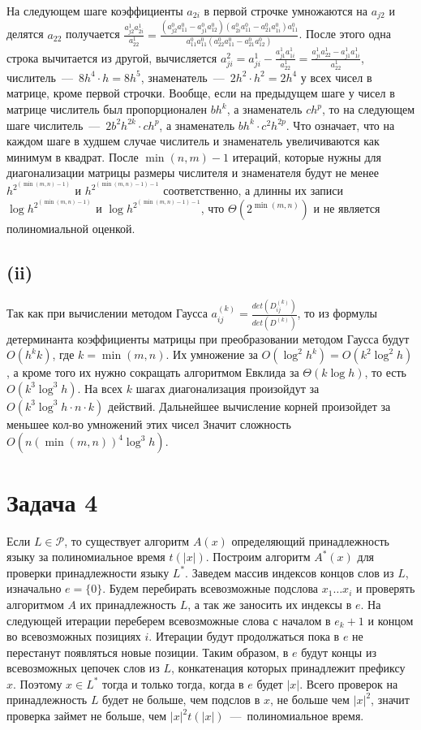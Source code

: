 \documentclass[a4paper,12pt]{article} %
\begin{document}
На следующем шаге коэффициенты $a_{2i}$ в первой строчке умножаются на $a_{j2}$ и делятся $a_{22}$ получается $\frac{a_{j2}^1a_{2i}^1}{a_{22}^1}=\frac{(a_{j2}^0a_{11}^0-a_{j1}^0a_{12}^0)(a_{2i}^0a_{11}^0-a_{21}^0a_{1i}^0)a_{11}^0}{a_{11}^0a_{11}^0(a_{22}^0a_{11}^0-a_{21}^0a_{12}^0)}$. После этого одна строка вычитается из другой, вычисляется $a_{ji}^2=a_{ji}^1-\frac{a_{j1}^1a_{1i}^1}{a_{22}^1}=\frac{a_{ji}^1a_{22}^1-a_{j1}^1a_{1i}^1}{a_{22}^1}$, числитель~---~$8h^4\cdot h=8h^5$, знаменатель~---~$2h^2\cdot h^2=2h^4$ у всех чисел в матрице, кроме первой строчки. Вообще, если на предыдущем шаге у чисел в матрице числитель был пропорционален $bh^k$, а знаменатель $ch^p$, то на следующем шаге числитель~---~$2b^2h^{2k}\cdot ch^p$, а знаменатель $bh^k\cdot c^2h^{2p}$. Что означает, что на каждом шаге в худшем случае числитель и знаменатель увеличиваются как минимум в квадрат. После $\min(n,m)-1$ итераций, которые нужны для диагонализации матрицы размеры числителя и знаменателя будут не менее $h^{2^{(\min(m,n)-1)}}$ и $h^{2^{(\min(m,n)-1)-1}}$ соответственно, а длинны их записи $\log{h^{2^{(\min(m,n)-1)}}}$ и $\log{h^{2^{(\min(m,n)-1)-1}}}$, что $\Theta(2^{\min(m,n)})$ и не является полиномиальной оценкой.

\subsection{(ii)}
\hspace{5mm}
Так как при вычислении методом Гаусса $a_{ij}^{(k)}=\frac{det(D_{ij}^{(k)})}{det(D^{(k)})}$, то из формулы детерминанта коэффициенты матрицы при преобразовании методом Гаусса будут $O(h^{k}k)$, где $k=\min(m,n)$. Их умножение за $O(\log^2{h^k})=O(k^2\log^2{h})$, а кроме того их нужно сокращать алгоритмом Евклида за $\Theta(k\log h)$, то есть $O(k^3\log^3 h)$. На всех $k$ шагах диагонализация произойдут за $O(k^3\log^3 h \cdot n \cdot k)$ действий. Дальнейшее вычисление корней произойдет за меньшее кол-во умножений этих чисел Значит сложность $O(n(\min(m,n))^4\log^3 h)$.

\section{Задача 4}
\hspace{5mm}
Если $L\in \mathcal{P}$, то существует алгоритм $A(x)$ определяющий принадлежность языку за полиномиальное время $t(|x|)$. Построим алгоритм $A^*(x)$ для проверки принадлежности языку $L^*$. Заведем массив индексов концов слов из $L$, изначально $e=\{0\}$. Будем перебирать всевозможные подслова $x_1\ldots x_i$ и проверять алгоритмом $A$ их принадлежность $L$, а так же заносить их индексы в $e$. На следующей итерации переберем всевозможные слова с началом в $e_k+1$ и концом во всевозможных позициях $i$. Итерации будут продолжаться пока в $e$ не перестанут появляться новые позиции. Таким образом, в $e$ будут концы из всевозможных цепочек слов из $L$, конкатенация которых принадлежит префиксу $x$. Поэтому $x\in L^*$ тогда и только тогда, когда в $e$ будет $|x|$. Всего проверок на принадлежность $L$ будет не больше, чем подслов в $x$, не больше чем $|x|^2$, значит проверка займет не больше, чем $|x|^2t(|x|)$~---~полиномиальное время.
\end{document}
